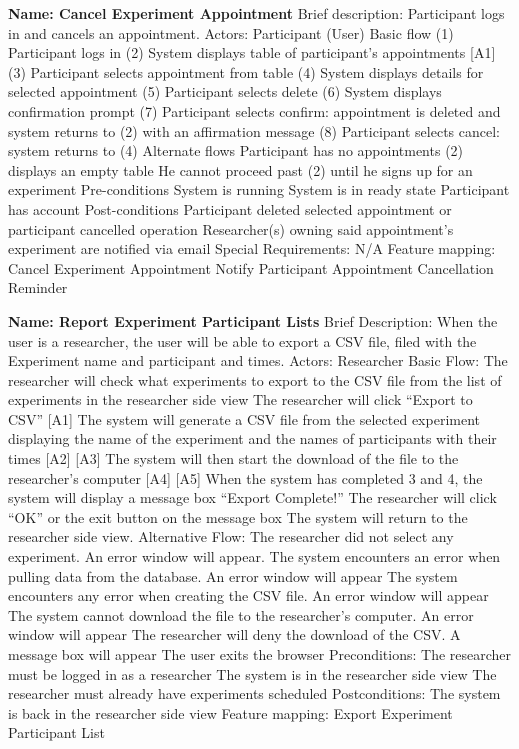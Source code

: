 \begin{outline}[enumerate]
\1 {\bf Name: Cancel Experiment Appointment}
\2 Brief description: Participant logs in and cancels an appointment.
\2 Actors: Participant (User)
\2 Basic flow
\3 (1) Participant logs in
\3 (2) System displays table of participant's appointments [A1]
\3 (3) Participant selects appointment from table
\3 (4) System displays details for selected appointment
\3 (5) Participant selects delete
\3 (6) System displays confirmation prompt
\3 (7) Participant selects confirm: appointment is deleted and system returns to (2) with an affirmation message
\3 (8) Participant selects cancel: system returns to (4)
\2 Alternate flows
\3 [A1] Participant has no appointments
\4 (2) displays an empty table
\4 He cannot proceed past (2) until he signs up for an experiment
\2 Pre-conditions
\3 System is running
\3 System is in ready state
\3 Participant has account
\2 Post-conditions
\3 Participant deleted selected appointment or participant cancelled operation
\3 Researcher(s) owning said appointment's experiment are notified via email
\2 Special Requirements:
\3 N/A
\2 Feature mapping:
\3 Cancel Experiment Appointment
\3 Notify Participant Appointment Cancellation Reminder


\1 {\bf Name: Report Experiment Participant Lists}
\2 Brief Description:  When the user is a researcher, the user will be able to export a CSV file, filed with the Experiment name and participant and times.
\2 Actors: Researcher
\2 Basic Flow:
\3 The researcher will check what experiments to export to the CSV file from the list of experiments in the researcher side view
\3 The researcher will click “Export to CSV” [A1] 
\3 The system will generate a CSV file from the selected experiment displaying the name of the experiment and the names of participants with their times [A2] [A3]
\3 The system will then start the download of the file to the researcher's computer [A4] [A5]
\3 When the system has completed 3 and 4, the system will display a message box “Export Complete!”
\3 The researcher will click “OK” or the exit button on the message box
\3 The system will return to the researcher side view.
\2 Alternative Flow:
\3 [A1] The researcher did not select any experiment.  An error window will appear.
\3 [A2] The system encounters an error when pulling data from the database. An error window will appear
\3 [A3] The system encounters any error when creating the CSV file. An error window will appear
\3 [A4] The system cannot download the file to the researcher’s computer. An error window will appear
\3 [A5] The researcher will deny the download of the CSV.  A message box will appear
\3 [A6] The user exits the browser
\2 Preconditions:
\3 The researcher must be logged in as a researcher
\3 The system is in the researcher side view
\3 The researcher must already have experiments scheduled
\2 Postconditions:
\3 The system is back in the researcher side view
\2 Feature mapping:
\3 Export Experiment Participant List


\end{outline}
